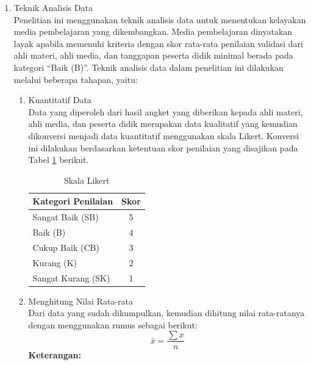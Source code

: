 \documentclass[12pt]{article}
\begin{document}
\begin{enumerate}
\begin{enumerate}
\begin{enumerate}
\begin{table}[H]
\begin{tabular}{|c|p{4cm}|p{3cm}|p{4cm}|}
                    
                \end{tabular}
            \end{table}
        \end{enumerate}
    \end{enumerate}
    \item Teknik Analisis Data\\
    \hspace*{1cm}Penelitian ini menggunakan teknik analisis data untuk menentukan kelayakan media pembelajaran yang dikembangkan. Media pembelajaran dinyatakan layak apabila memenuhi kriteria dengan skor rata-rata penilaian validasi dari ahli materi, ahli media, dan tanggapan peserta didik minimal berada pada kategori “Baik (B)”. Teknik analisis data dalam penelitian ini dilakukan melalui beberapa tahapan, yaitu:
    \begin{enumerate}
        \item Kuantitatif Data\\
        \hspace*{1cm}Data yang diperoleh dari hasil angket yang diberikan kepada ahli materi, ahli media, dan peserta didik merupakan data kualitatif yang kemudian dikonversi menjadi data kuantitatif menggunakan skala Likert. Konversi ini dilakukan berdasarkan ketentuan skor penilaian yang disajikan pada Tabel \ref{likert} berikut.
        \begin{table}[H]
            \centering
            \caption{Skala Likert}
            \label{likert}
            \begin{tabular}{|p{5cm}|c|}
                \hline
                \textbf{Kategori Penilaian} & \textbf{Skor}\\
                \hline
                Sangat Baik (SB) & 5\\
                Baik (B) & 4\\
                Cukup Baik (CB) & 3\\
                Kurang (K) & 2\\
                Sangat Kurang (SK) & 1\\
                \hline
            \end{tabular}
        \end{table}
        \item Menghitung Nilai Rata-rata\\
        \hspace*{1cm}Dari data yang sudah dikumpulkan, kemudian dihitung nilai rata-ratanya dengan menggunakan rumus sebagai berikut:
        \begin{equation}
            \bar{x}=\frac{\sum x}{n}
        \end{equation}
        \textbf{Keterangan:}


\end{enumerate}
\end{enumerate}
\end{document}
